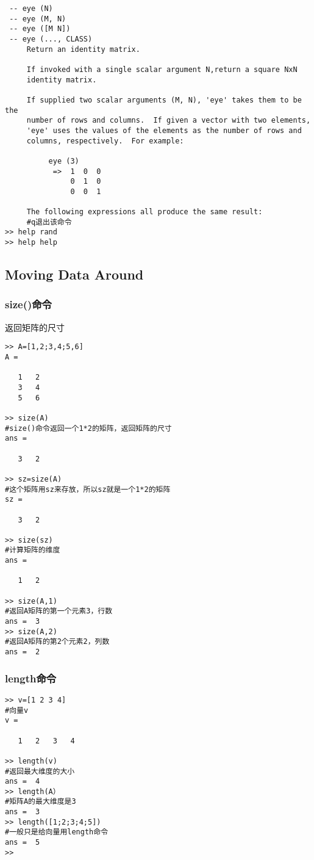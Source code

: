 \documentclass{article}
\begin{document}
\begin{CJK}{UTF8}{gbsn}
\begin{verbatim}
 -- eye (N)
 -- eye (M, N)
 -- eye ([M N])
 -- eye (..., CLASS)
     Return an identity matrix.

     If invoked with a single scalar argument N,return a square NxN
     identity matrix.

     If supplied two scalar arguments (M, N), 'eye' takes them to be the
     number of rows and columns.  If given a vector with two elements,
     'eye' uses the values of the elements as the number of rows and
     columns, respectively.  For example:

          eye (3)
           =>  1  0  0
               0  1  0
               0  0  1

     The following expressions all produce the same result:
     #q退出该命令
>> help rand
>> help help
\end{verbatim}
\subsection{Moving Data Around}
\subsubsection{size()命令}
返回矩阵的尺寸
\begin{verbatim}
>> A=[1,2;3,4;5,6]
A =

   1   2
   3   4
   5   6

>> size(A)
#size()命令返回一个1*2的矩阵，返回矩阵的尺寸
ans =

   3   2

>> sz=size(A)
#这个矩阵用sz来存放，所以sz就是一个1*2的矩阵
sz =

   3   2

>> size(sz)
#计算矩阵的维度
ans =

   1   2

>> size(A,1)
#返回A矩阵的第一个元素3，行数
ans =  3
>> size(A,2)
#返回A矩阵的第2个元素2，列数
ans =  2
\end{verbatim}
\subsubsection{length命令}
\begin{verbatim}
>> v=[1 2 3 4]
#向量v
v =

   1   2   3   4

>> length(v)
#返回最大维度的大小
ans =  4
>> length(A）
#矩阵A的最大维度是3
ans =  3
>> length([1;2;3;4;5])
#一般只是给向量用length命令
ans =  5
>>
\end{verbatim}

\end{CJK}
\end{document}
